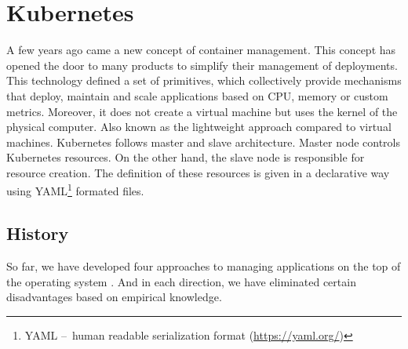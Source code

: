 \section{Kubernetes}
\label{01:sec:title}

A few years ago came a new concept of container management. This concept has opened the door to many products to simplify their management of deployments. This technology defined a set of primitives, which collectively provide mechanisms that deploy, maintain and scale applications based on CPU, memory or custom metrics. Moreover, it does not create a virtual machine but uses the kernel of the physical computer. Also known as the lightweight approach compared to virtual machines. Kubernetes follows master and slave architecture. Master node controls Kubernetes resources. On the other hand, the slave node is responsible for resource creation. The definition of these resources is given in a declarative way using YAML\footnote{YAML 
\---\ human readable serialization format (\url{https://yaml.org/})} formated files.

\subsection{History}
\label{fig:history}

So far, we have developed four approaches to managing applications on the top of the operating system \cite{history}. And in each direction, we have eliminated certain disadvantages based on empirical knowledge. 

